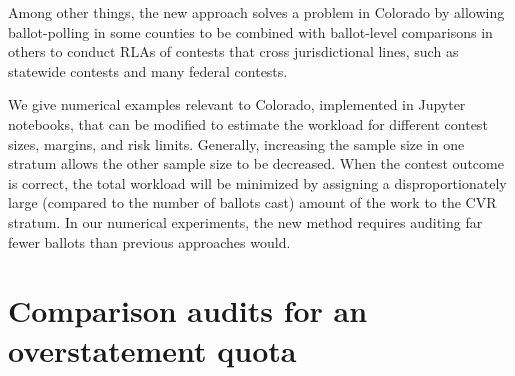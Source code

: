 \documentclass[runningheads]{llncs}
\begin{document}
Among other things, the new approach solves a problem in Colorado by allowing ballot-polling in some counties to be combined with ballot-level comparisons in others to conduct RLAs of contests that cross jurisdictional lines, such as statewide contests and many federal contests.

We give numerical examples relevant to Colorado, implemented in Jupyter notebooks, that can be modified to estimate the workload for different contest sizes, margins, and risk limits.
Generally, increasing the sample size in one stratum allows the other sample size to be decreased.
When the contest outcome is correct, the total workload will be minimized by 
assigning a disproportionately large (compared to the number of ballots cast) amount of 
the work to the CVR stratum.
In our numerical experiments, the new method requires auditing far fewer ballots than previous approaches would. 

\appendix
\section{Comparison audits for an overstatement quota}\label{sec:appendix-comparison}
\end{document}
